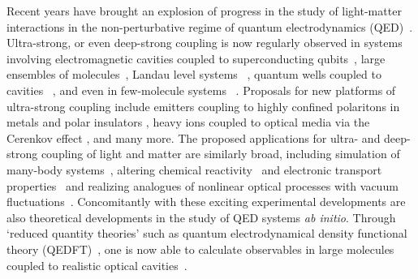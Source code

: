 \documentclass[aps,prl,twocolumn,
	groupedaddress,superscriptaddress,
	amsfonts,amssymb,amsmath,floatfix,
	citeautoscript]{revtex4-1}
\begin{document}
 Recent years have brought an explosion of progress in the study of light-matter interactions in the non-perturbative regime of quantum electrodynamics (QED)~\cite{flick7strong,ruggenthaler2017b,forn2018ultrastrong}. Ultra-strong, or even deep-strong coupling is now regularly observed in systems involving electromagnetic cavities coupled to superconducting qubits~\cite{blais2004,wallraff2004,yoshihara2017superconducting,forn2017ultrastrong}, large ensembles of molecules~\cite{hutchison2012,hutchison2013,coles2014,coles2014b,shalabney2015coherent, thomas2016,ebbesen2016}, Landau level systems ~\cite{scalari2012ultrastrong,zhang2016collective},  quantum wells coupled to cavities ~\cite{todorov2010ultrastrong,geiser2012ultrastrong}, and even in few-molecule systems ~\cite{benz2016,chikkaraddy2016}. Proposals for new platforms of ultra-strong coupling include emitters coupling to highly confined polaritons in metals and polar insulators \cite{rivera2016shrinking}, heavy ions coupled to optical media via the Cerenkov effect \cite{carmes2018non}, and many more. The proposed applications for ultra- and deep-strong coupling of light and matter are similarly broad, including simulation of many-body systems~\cite{forn2018ultrastrong}, altering chemical reactivity~\cite{hutchison2012, thomas2016,flick2017} and electronic transport properties~\cite{orgiu2015} and realizing analogues of nonlinear optical processes with vacuum fluctuations~\cite{kockum2017deterministic}. Concomitantly with these exciting experimental developments are also theoretical developments in the study of QED systems \textit{ab initio}. Through `reduced quantity theories' such as quantum electrodynamical density functional theory (QEDFT)~\cite{tokatly2013,ruggenthaler2014,flick2015,dimitrov2017,flick2018,flick2018b}, one is now able to calculate observables in large molecules coupled to realistic optical cavities~\cite{pellegrini2015,flick2017c}. 
\end{document}
